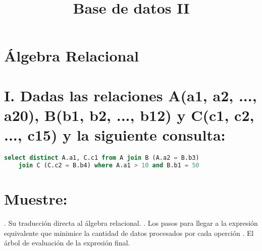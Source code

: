 \documentclass[a4paper]{article}
\title{Base de datos II}
\date{}
\begin{document}
\maketitle
\vspace{-2.5cm} %
\section*{Álgebra Relacional}
\section*{I. Dadas las relaciones A(a1, a2, ..., a20), B(b1, b2, ..., b12) y C(c1, c2, ..., c15) y la siguiente consulta:}
\begin{center}
\vspace{0.5cm} 
\begin{lstlisting}[language=sql]
    select distinct A.a1, C.c1 from A join B (A.a2 = B.b3)
    join C (C.c2 = B.b4) where A.a1 > 10 and B.b1 = 50
\end{lstlisting}
\vspace{0.5cm}     
\end{center}

\section*{Muestre:}
{\fontsize{15pt}{13pt}. Su traducción directa al álgebra relacional. . Los pasos para llegar a la expresión equivalente que minimice la cantidad de datos procesados por cada operción . El árbol de evaluación de la expresión final.}
\end{document}
